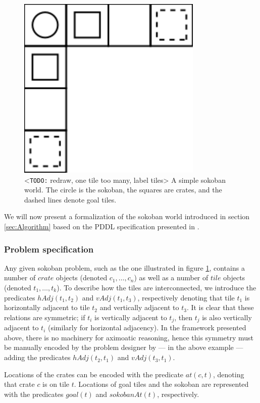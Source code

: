 \documentclass[../Master.tex]{subfiles}
\begin{document}
\begin{figure}
    \centering
    \includegraphics[scale=0.7]{../Graphics/soko1}
    \caption{\label{fig:simpleSokoban} <\texttt{TODO:} redraw, one tile too many, label tiles> A simple sokoban world. The circle is the sokoban, the squares are crates, and the dashed lines denote goal tiles.}
\end{figure}

We will now present a formalization of the sokoban world introduced in section \ref{sec:Algorithm} based on the PDDL specification presented in \cite{BS2011}.

\subsubsection{Problem specification}
Any given sokoban problem, such as the one illustrated in figure \ref{fig:simpleSokoban}, contains a number of $crate$ objects (denoted $c_1, \dots, c_n$) as well as a number of $tile$ objects (denoted $t_1, \dots, t_k$). To describe how the tiles are interconnected, we introduce the predicates $hAdj(t_1,t_2)$ and $vAdj(t_1,t_3)$, respectively denoting that tile $t_1$ is horizontally adjacent to tile $t_2$ and vertically adjacent to $t_3$. It is clear that these relations are symmetric; if $t_i$ is vertically adjacent to $t_j$, then $t_j$ is also vertically adjacent to $t_i$ (similarly for horizontal adjacency). In the framework presented above, there is no machinery for aximoatic reasoning, hence this symmetry must be manually encoded by the problem designer by --- in the above example --- adding the predicates $hAdj(t_2,t_1)$ and $vAdj(t_3,t_1)$.

Locations of the crates can be encoded with the predicate $at(c, t)$, denoting that crate $c$ is on tile $t$. Locations of goal tiles and the sokoban are represented with the predicates $goal(t)$ and $sokobanAt(t)$, respectively.
\end{document}
